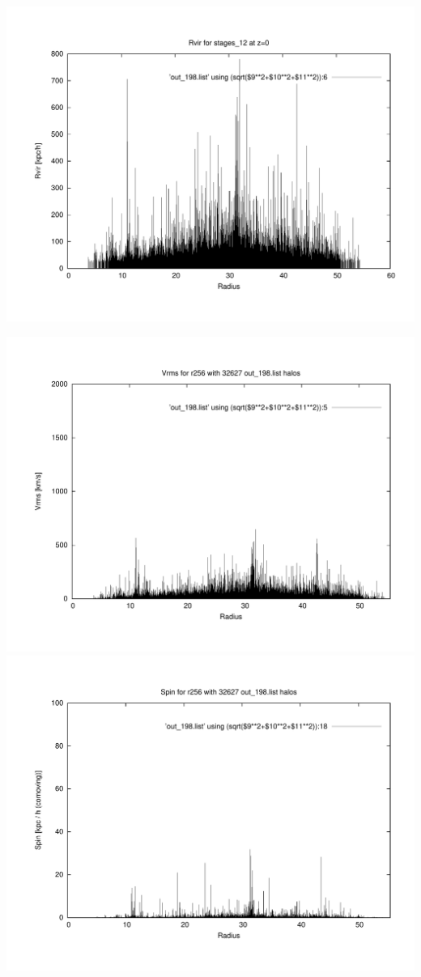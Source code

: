 \includegraphics[scale=0.3]{r256/stages_12/plot_rvir_z0.pdf}

\includegraphics[scale=0.3]{r256/stages_12/plot_Vrms_out_198.pdf}
\includegraphics[scale=0.3]{r256/stages_12/plot_spin_out_198.pdf}

